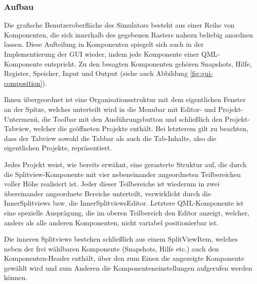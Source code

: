 \subsubsection{Aufbau}

Die grafische Benutzeroberfläche des Simulators besteht aus einer Reihe von
Komponenten, die sich innerhalb des gegebenen Rasters nahezu beliebig anordnen
lassen. Diese Aufteilung in Komponenten spiegelt sich auch in der
Implementierung der GUI wieder, indem jede Komponente einer QML-Komponente
entspricht. Zu den besagten Komponenten gehören Snapshots, Hilfe, Register,
Speicher, Input und Output (siehe auch Abbildung \ref{fig:gui-composition}).

Ihnen übergeordnet ist eine Organisationsstruktur mit dem eigentlichen Fenster
an der Spitze, welches unterteilt wird in die Menubar mit Editor- und
Projekt-Untermenü, die Toolbar mit den Ausführungsbutton und schließlich den
Projekt-Tabview, welcher die geöffneten Projekte enthält. Bei letzterem gilt zu
beachten, dass der Tabview sowohl die Tabbar als auch die Tab-Inhalte, also die
eigentlichen Projekte, repräsentiert.

Jedes Projekt weist, wie bereits erwähnt, eine gerasterte Struktur auf, die
durch die Splitview-Komponente mit vier nebeneinander angeordneten Teilbereichen
voller Höhe realisiert ist. Jeder dieser Teilbereiche ist wiederum in zwei
übereinander angeordnete Bereiche unterteilt, verwirklicht durch die
InnerSplitviews bzw. die InnerSplitviewsEditor. Letztere QML-Komponente ist eine
spezielle Ausprägung, die im oberen Teilbereich den Editor anzeigt, welcher,
anders als alle anderen Komponenten, nicht variabel positionierbar ist.

Die inneren Splitviews bestehen schließlich aus einem SplitViewItem, welches
neben der frei wählbaren Komponente (Snapshots, Hilfe etc.) auch den
Komponenten-Header enthält, über den zum Einen die angezeigte Komponente gewählt
wird und zum Anderen die Komponenteneinstellungen aufgerufen werden können.

